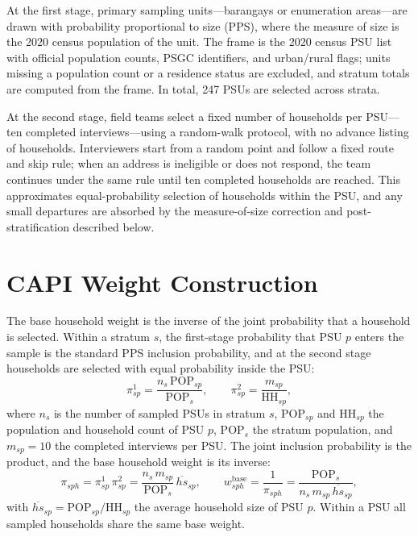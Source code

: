 \documentclass[AEJ]{AEA}
\begin{document}
At the first stage, primary sampling units---barangays or enumeration
areas---are drawn with probability proportional to size (PPS), where the measure
of size is the 2020 census population of the unit. The frame is the 2020 census
PSU list with official population counts, PSGC identifiers, and urban/rural flags;
units missing a population count or a residence status are excluded, and stratum
totals are computed from the frame. In total, 247 PSUs are selected across strata.

At the second stage, field teams select a fixed number of households per
PSU---ten completed interviews---using a random-walk protocol, with no advance
listing of households. Interviewers start from a random point and follow a fixed
route and skip rule; when an address is ineligible or does not respond, the team
continues under the same rule until ten completed households are reached. This
approximates equal-probability selection of households within the PSU, and any
small departures are absorbed by the measure-of-size correction and
post-stratification described below.

\section{CAPI Weight Construction}

The base household weight is the inverse of the joint probability that a
household is selected. Within a stratum $s$, the first-stage probability that PSU
$p$ enters the sample is the standard PPS inclusion probability, and at the second
stage households are selected with equal probability inside the PSU:
%
\begin{equation}
\pi^{1}_{sp} = \frac{n_s\,\mathrm{POP}_{sp}}{\mathrm{POP}_s},
\qquad
\pi^{2}_{sp} = \frac{m_{sp}}{\mathrm{HH}_{sp}},
\end{equation}
%
where $n_s$ is the number of sampled PSUs in stratum $s$, $\mathrm{POP}_{sp}$ and
$\mathrm{HH}_{sp}$ the population and household count of PSU $p$, $\mathrm{POP}_s$
the stratum population, and $m_{sp}=10$ the completed interviews per PSU. The
joint inclusion probability is the product, and the base household weight is its
inverse:
%
\begin{equation}
\pi_{sph} = \pi^{1}_{sp}\,\pi^{2}_{sp}
= \frac{n_s\, m_{sp}}{\mathrm{POP}_s}\,\overline{hs}_{sp},
\qquad
w^{\mathrm{base}}_{sph} = \frac{1}{\pi_{sph}}
= \frac{\mathrm{POP}_s}{n_s\, m_{sp}\,\overline{hs}_{sp}},
\end{equation}
%
with $\overline{hs}_{sp}=\mathrm{POP}_{sp}/\mathrm{HH}_{sp}$ the average household
size of PSU $p$. Within a PSU all sampled households share the same base weight.
\end{document}

